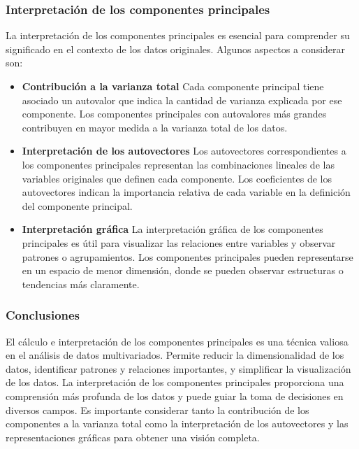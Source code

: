 \documentclass{article}
\begin{document}
\subsubsection{Interpretación de los componentes principales}
La interpretación de los componentes principales es esencial para comprender su significado en el contexto de los datos originales. Algunos aspectos a considerar son:
\begin{itemize}
\item \textbf{Contribución a la varianza total}
Cada componente principal tiene asociado un autovalor que indica la cantidad de varianza explicada por ese componente. Los componentes principales con autovalores más grandes contribuyen en mayor medida a la varianza total de los datos.

\item \textbf{Interpretación de los autovectores}
Los autovectores correspondientes a los componentes principales representan las combinaciones lineales de las variables originales que definen cada componente. Los coeficientes de los autovectores indican la importancia relativa de cada variable en la definición del componente principal.

\item \textbf{Interpretación gráfica}
La interpretación gráfica de los componentes principales es útil para visualizar las relaciones entre variables y observar patrones o agrupamientos. Los componentes principales pueden representarse en un espacio de menor dimensión, donde se pueden observar estructuras o tendencias más claramente.
\end{itemize}
\subsubsection*{Conclusiones}
El cálculo e interpretación de los componentes principales es una técnica valiosa en el análisis de datos multivariados. Permite reducir la dimensionalidad de los datos, identificar patrones y relaciones importantes, y simplificar la visualización de los datos. La interpretación de los componentes principales proporciona una comprensión más profunda de los datos y puede guiar la toma de decisiones en diversos campos. Es importante considerar tanto la contribución de los componentes a la varianza total como la interpretación de los autovectores y las representaciones gráficas para obtener una visión completa.
\end{document}
